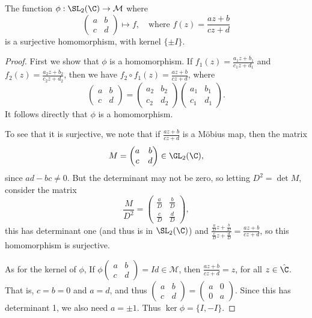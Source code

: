\documentclass[a4paper]{scrartcl}
\begin{document}
\begin{proposition}
	The function $\phi : \SL_2(\C) \rightarrow \mathcal{M}$ where 
	$$
		\begin{pmatrix}
			a & b \\ c & d
		\end{pmatrix} \longmapsto f, \quad \text{where } f(z) = \frac{az + b}{cz + d} 
	$$
	is a surjective homomorphism, with kernel $\{\pm I\}$.
\end{proposition}
\begin{proof}
	First we show that $\phi$ is a homomorphism. If $f_1(z) = \frac{a_1 z + b_1}{c_1 z + d_1}$ and $f_2(z) = \frac{a_2 z + b_2}{c_2 z + d_2}$, then we have $f_2 \circ f_1(z) = \frac{az + b}{cz + d}$, where
	$$
	\begin{pmatrix}
		a & b \\
		c & d
		\end{pmatrix}=\begin{pmatrix}
		a_{2} & b_{2} \\
		c_2 & d_{2}
		\end{pmatrix}\begin{pmatrix}
		a_{1} & b_{1} \\
		c_{1} & d_{1}
		\end{pmatrix}.
	$$
	It follows directly that $\phi$ is a homomorphism.

	To see that it is surjective, we note that if $\frac{az + b}{cz + d}$ is a Möbius map, then the matrix
	$$
	M = \begin{pmatrix}
		a & b \\
		c & d
		\end{pmatrix} \in \GL_2(\C),
	$$
	since $ad - bc \neq 0$. But the determinant may not be zero, so letting $D^2= \det M$, consider the matrix
	$$
	\frac{M}{D^2} = \begin{pmatrix}
		\frac{a}{D} & \frac{b}{D} \\
		\frac{c}{D} & \frac{d}{D}
		\end{pmatrix},
	$$
	this has determinant one (and thus is in $\SL_2(\C)$) and $\frac{\frac{a}{D}z + \frac{b}{D}}{\frac{c}{D}z + \frac{d}{D}} = \frac{az + b}{cz + d}$, so this homomorphism is surjective.

	As for the kernel of $\phi$, If $\phi\begin{pmatrix}
		a & b \\ c & d
	\end{pmatrix} = Id \in \mathcal{M}$, then $\frac{az + b}{cz + d} = z$, for all $z \in \hat{\C}$. That is, $c = b = 0$ and $a = d$, and thus $\begin{pmatrix}
		a & b \\ c & d
	\end{pmatrix} = \begin{pmatrix}
		a & 0 \\ 0 & a
	\end{pmatrix}$. Since this has determinant 1, we also need $a = \pm  1$. Thus $\ker \phi = \{I, -I\}$.
\end{proof}
\end{document}
